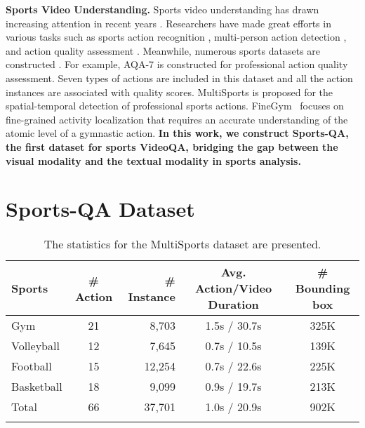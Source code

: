 {\noindent\textbf{Sports Video Understanding.} Sports video understanding has drawn increasing attention in recent years \citep{yuan2021spatio,li2021groupformer,koshkina2021contrastive,zhu2022fencenet,martin2020fine,wang2022shuttlenet}. Researchers have made great efforts in various tasks such as sports action recognition \citep{shao2020finegym}, multi-person action detection \citep{li2021multisports}, and action quality assessment \citep{tang2020uncertainty}. Meanwhile, numerous sports datasets are constructed \citep{parmar2019action,li2021multisports,giancola2018soccernet,deliege2021soccernet}.  
For example, AQA-7 \citep{parmar2019action} is constructed for professional action quality assessment. Seven types of actions are included in this dataset and all the action instances are associated with quality scores. 
MultiSports \citep{li2021multisports} is proposed for the spatial-temporal detection of professional sports actions. FineGym~\citep{shao2020finegym} focuses on fine-grained activity localization that requires an accurate understanding of the atomic level of a gymnastic action.
\textbf{In this work, we construct Sports-QA, the first dataset for sports VideoQA, bridging the gap between the visual modality and the textual modality in sports analysis.}






\section{Sports-QA Dataset}


\begin{table}[tbp]
\caption{The statistics for the MultiSports dataset are presented.} 
\label{mss}
\begin{tabular}{@{}lcrcc@{}}
\toprule
 Sports          & \# Action & \# Instance & Avg. Action/Video Duration & \# Bounding box \\ \midrule
Gym        & 21      & 8,703     & 1.5s / 30.7s        & 325K    \\
Volleyball & 12      & 7,645     & 0.7s / 10.5s        & 139K   \\
Football   & 15      & 12,254    & 0.7s / 22.6s        & 225K    \\
Basketball & 18      & 9,099     & 0.9s / 19.7s        & 213K   \\\midrule
Total      & 66      & 37,701    & 1.0s / 20.9s        & 902K   \\ \botrule
\end{tabular}
\end{table}

}
